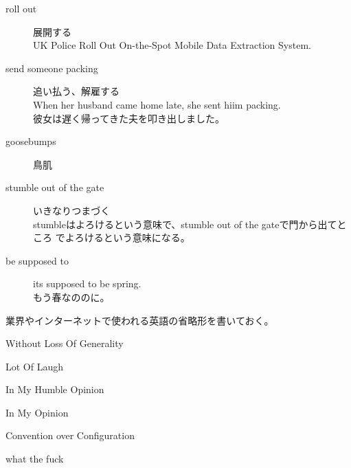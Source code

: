 \begin{description}
		\item[roll out] 展開する \\
		UK Police Roll Out On-the-Spot Mobile Data Extraction System.
		\item[send someone packing] 追い払う、解雇する \\
		When her husband came home late, she sent hiim packing. \\
		彼女は遅く帰ってきた夫を叩き出しました。
		\item[goosebumps] 鳥肌
		\item[stumble out of the gate] いきなりつまづく \\
		stumbleはよろけるという意味で、stumble out of the gateで門から出てところ
		でよろけるという意味になる。
		\item[be supposed to] its supposed to be spring. \\
		もう春なののに。
	\end{description} %

	業界やインターネットで使われる英語の省略形を書いておく。
	\begin{description}\setlength{\itemsep}{-1mm} %
		\item[WOLOG] Without Loss Of Generality
		\item[LOL] Lot Of Laugh
		\item[IMHO] In My Humble Opinion
		\item[IMO] In My Opinion
		\item[CoC] Convention over Configuration
		\item[WTF] what the fuck
	\end{description} %
